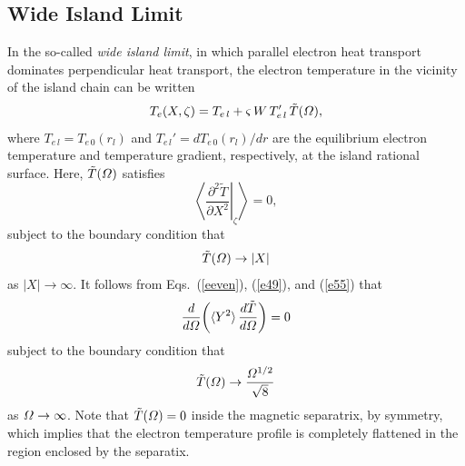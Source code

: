 \documentclass[12pt,prb,aps]{revtex4-1}
\begin{document}
\subsection{Wide Island Limit}
In the so-called {\em wide island limit}, in which parallel electron heat transport dominates perpendicular heat transport,\cite{ntm2,island}
the electron temperature in the vicinity of the island chain can be written
\begin{equation}
T_e(X,\zeta) = T_{e\,l} + \varsigma\,W\,T_{e\,l}'\,\tilde{T}({\mit\Omega}),
\end{equation}
where $T_{e\,l}= T_{e\,0}(r_l)$ and $T_{e\,l}' = dT_{e\,0}(r_l)/dr$ are the equilibrium electron temperature and  temperature
gradient, respectively, at the island rational surface. 
Here, 
$\tilde{T}({\mit\Omega})$ satisfies\,\cite{ntm2}
\begin{equation}\label{e30}
\left\langle \left.\frac{\partial ^2\tilde{T}}{\partial X^2}\right|_\zeta \right\rangle =0,
\end{equation}
subject to the boundary condition that
\begin{equation}
\tilde{T}({\mit\Omega})\rightarrow |X|
\end{equation}
as $|X|\rightarrow \infty$. It
follows  from Eqs.~(\ref{eeven}), (\ref{e49}), and (\ref{e55})  that
\begin{equation}\label{e34}
\frac{d}{d{\mit\Omega}}\!\left(\langle Y^2\rangle\,\frac{d\tilde{T}}{d{\mit\Omega}}\right)=0
\end{equation}
subject to the boundary condition that
\begin{equation}
\tilde{T}({\mit\Omega})\rightarrow \frac{{\mit\Omega}^{1/2}}{\sqrt{8}}
\end{equation}
as ${\mit\Omega}\rightarrow\infty$. Note that $\tilde{T}({\mit\Omega})=0$ inside the magnetic separatrix, by symmetry, which implies that the electron
temperature profile is completely flattened in the region enclosed  by the separatix. \cite{ntm2}
\end{document}
